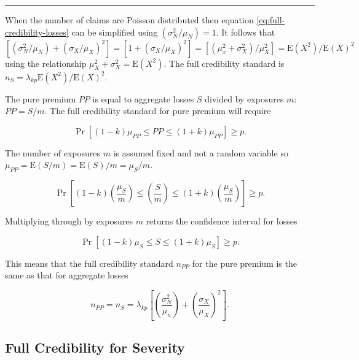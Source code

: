 \documentclass[]{book}
\theoremstyle{definition}
\theoremstyle{definition}
\theoremstyle{definition}
\theoremstyle{remark}
\begin{document}
\begin{center}\rule{0.5\linewidth}{\linethickness}\end{center}

When the number of claims are Poisson distributed then equation
\eqref{eq:full-credibility-losses} can be simplified using
\((\sigma_N^2/\mu_N)=1\). It follows that
\([(\sigma_N^2/\mu_N)+(\sigma_X/\mu_X)^2]=[1+(\sigma_X/\mu_X)^2]=[(\mu_x^2+\sigma_X^2)/\mu_X^2]=\mathrm{E}(X^2)/\mathrm{E}(X)^2\)
using the relationship \(\mu_X^2+\sigma_X^2=\mathrm{E}(X^2)\). The full
credibility standard is
\(n_S=\lambda_{kp}\mathrm{E}(X^2)/\mathrm{E}(X)^2\).

The pure premium \(PP\) is equal to aggregate losses \(S\) divided by
exposures \(m\): \(PP=S/m\). The full credibility standard for pure
premium will require

\begin{equation*}
\Pr\left[(1-k)\mu_{PP}\leq PP \leq(1+k)\mu_{PP}\right] \geq p.
\end{equation*}

\noindent The number of exposures \(m\) is assumed fixed and not a
random variable so \(\mu_{PP}=\mathrm{E}(S/m)=\mathrm{E}(S)/m=\mu_S/m\).

\begin{equation*}
\Pr\left[(1-k)\left(\frac{\mu_S}{m}\right)\leq \left(\frac{S}{m}\right) \leq(1+k)\left(\frac{\mu_S}{m}\right)\right] \geq p.
\end{equation*}

\noindent Multiplying through by exposures \(m\) returns the confidence
interval for losses

\begin{equation*}
\Pr[(1-k)\mu_S\leq S \leq(1+k)\mu_S] \geq p.
\end{equation*}

\noindent This means that the full credibility standard \(n_{PP}\) for
the pure premium is the same as that for aggregate losses

\begin{equation*}
n_{PP}=n_S=\lambda_{kp}\left[\left(\frac{\sigma_N^2}{\mu_n}\right)+\left(\frac{\sigma_X}{\mu_X}\right)^2\right].
\end{equation*}

\subsection{Full Credibility for
Severity}\label{full-credibility-for-severity}
\end{document}
